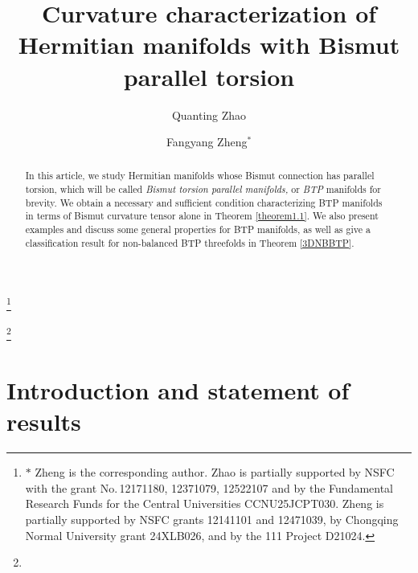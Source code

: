 \documentclass{amsart}
\numberwithin{equation}{section}
\theoremstyle{definition}
\renewcommand{\1}{\mathds{1}}
\renewcommand{\>}{\rightarrow}
\begin{document}
\title{Curvature characterization of Hermitian manifolds with Bismut parallel torsion}

\begin{abstract}
In this article, we study Hermitian manifolds whose Bismut connection has parallel torsion, which will be called {\em Bismut torsion parallel manifolds,} or {\em BTP} manifolds for brevity. We obtain a necessary and sufficient condition characterizing BTP manifolds in terms of Bismut curvature tensor alone in Theorem \ref{theorem1.1}. We also present examples and discuss some general properties for BTP manifolds, as well as give a classification result for non-balanced BTP threefolds in Theorem \ref{3DNBBTP}.
\end{abstract}

\author{Quanting Zhao}
\address{Quanting Zhao. School of Mathematics and Statistics, and Hubei Key Laboratory of Mathematical Sciences, Central China Normal University, P.O. Box 71010, Wuhan 430079, P. R. China.} 
\thanks{$\ast$ Zheng is the corresponding author. Zhao is partially supported by NSFC with the grant No.\,12171180, 12371079, 12522107 and by the Fundamental Research Funds for the Central Universities CCNU25JCPT030. Zheng is partially supported by NSFC grants 12141101 and 12471039, by Chongqing Normal University grant 24XLB026, and by the 111 Project D21024.}

\author{Fangyang Zheng$^{\ast}$}
\address{Fangyang Zheng. School of Mathematical Sciences, Chongqing Normal University, Chongqing 401331, China}
 \thanks{}



\maketitle

\tableofcontents

\section{Introduction and statement of results}
\end{document}
